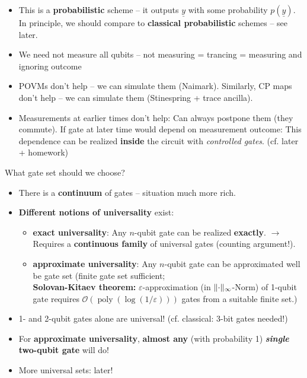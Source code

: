 \documentclass[a4paper, 12pt]{article}
\theoremstyle{plain}
\theoremstyle{definition}
\theoremstyle{remark}
\DeclareMathOperator{\poly}{poly}
\DeclarePairedDelimiter\norm{\lVert}{\rVert}%
\begin{document}
\begin{itemize}
  \item This is a \textbf{probabilistic} scheme -- it outputs $\underline{y}$ with some probability $p(\underline{y})$. In principle, we should compare to \textbf{classical probabilistic} schemes -- see later.
  \item We need not measure all qubits -- not measuring = trancing = measuring and ignoring outcome
  \item POVMs don't help -- we can simulate them (Naimark). Similarly, CP maps don't help -- we can simulate them (Stinespring + trace ancilla).
  \item Measurements at earlier times don't help: Can always postpone them (they commute). If gate at later time would depend on measurement outcome: This dependence can be realized \textbf{inside} the circuit with \emph{controlled gates}. (cf. later + homework)
\end{itemize}

What gate set should we choose?
\begin{itemize}
  \item There is a \textbf{continuum} of gates -- situation much more rich.
  \item \textbf{Different notions of universality} exist:
    \begin{itemize}
      \item \textbf{exact universality}: Any $n$-qubit gate can be realized \textbf{exactly}.
        $\longrightarrow$ Requires a \textbf{continuous family} of universal gates (counting argument!).
      \item \textbf{approximate universality}: Any $n$-qubit gate can be approximated well be gate set (finite gate set sufficient;\\
        \textbf{Solovan-Kitaev theorem:} $\varepsilon$-approximation (in $\norm{\cdot}_\infty$-Norm) of 1-qubit gate requires $\mathcal{O}(\poly(\log(1/\varepsilon)))$ gates from a suitable finite set.)
    \end{itemize}
  \item 1- and 2-qubit gates alone are universal! (cf. classical: 3-bit gates needed!)
  \item For \textbf{approximate universality}, \textbf{almost any} (with probability 1) \textbf{\emph{single} two-qubit gate} will do!
  \item More universal sets: later!
\end{itemize}
\end{document}
